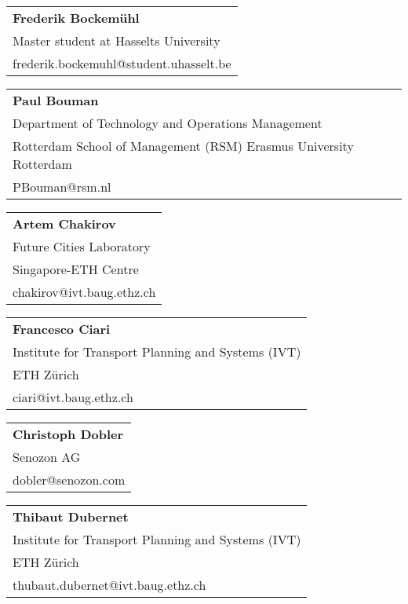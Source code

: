 \begin{tabular}[width=0.48\textwidth]{l}
\textbf{Frederik Bockemühl} \\
Master student at Hasselts University \\
frederik.bockemuhl@student.uhasselt.be \\
\end{tabular}

\begin{tabular}[width=0.48\textwidth]{l}
\textbf{Paul Bouman} \\
Department of Technology and Operations Management \\
Rotterdam School of Management (RSM) Erasmus University Rotterdam \\
PBouman@rsm.nl \\
\end{tabular}

\begin{tabular}[width=0.48\textwidth]{l}
\textbf{Artem Chakirov} \\
Future Cities Laboratory \\
Singapore-ETH Centre\\
chakirov@ivt.baug.ethz.ch \\
\end{tabular}

\begin{tabular}[width=0.48\textwidth]{l}
\textbf{Francesco Ciari} \\
Institute for Transport Planning and Systems (IVT) \\
ETH Zürich \\
ciari@ivt.baug.ethz.ch \\
\end{tabular}

\begin{tabular}[width=0.48\textwidth]{l}
\textbf{Christoph Dobler} \\
Senozon AG \\
dobler@senozon.com \\
\end{tabular}

\begin{tabular}[width=0.48\textwidth]{l}
\textbf{Thibaut Dubernet} \\
Institute for Transport Planning and Systems (IVT) \\
ETH Zürich \\
thubaut.dubernet@ivt.baug.ethz.ch \\
\end{tabular}

